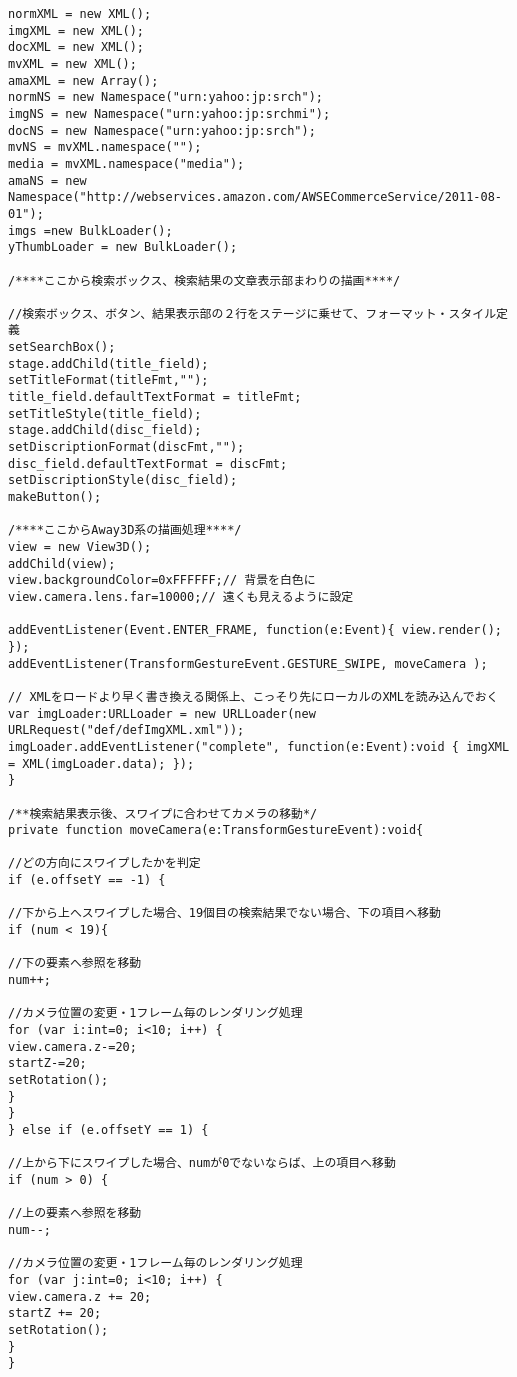 {\begin{verbatim}
normXML = new XML();
imgXML = new XML();
docXML = new XML();
mvXML = new XML();
amaXML = new Array();
normNS = new Namespace("urn:yahoo:jp:srch");
imgNS = new Namespace("urn:yahoo:jp:srchmi");
docNS = new Namespace("urn:yahoo:jp:srch");
mvNS = mvXML.namespace("");
media = mvXML.namespace("media");
amaNS = new Namespace("http://webservices.amazon.com/AWSECommerceService/2011-08-01");
imgs =new BulkLoader();
yThumbLoader = new BulkLoader();

/****ここから検索ボックス、検索結果の文章表示部まわりの描画****/

//検索ボックス、ボタン、結果表示部の２行をステージに乗せて、フォーマット・スタイル定義
setSearchBox();
stage.addChild(title_field);
setTitleFormat(titleFmt,"");
title_field.defaultTextFormat = titleFmt;
setTitleStyle(title_field);
stage.addChild(disc_field);
setDiscriptionFormat(discFmt,"");
disc_field.defaultTextFormat = discFmt;
setDiscriptionStyle(disc_field);
makeButton();

/****ここからAway3D系の描画処理****/
view = new View3D();
addChild(view);
view.backgroundColor=0xFFFFFF;// 背景を白色に
view.camera.lens.far=10000;// 遠くも見えるように設定

addEventListener(Event.ENTER_FRAME, function(e:Event){ view.render(); });
addEventListener(TransformGestureEvent.GESTURE_SWIPE, moveCamera );

// XMLをロードより早く書き換える関係上、こっそり先にローカルのXMLを読み込んでおく
var imgLoader:URLLoader = new URLLoader(new URLRequest("def/defImgXML.xml"));
imgLoader.addEventListener("complete", function(e:Event):void { imgXML = XML(imgLoader.data); });
}

/**検索結果表示後、スワイプに合わせてカメラの移動*/
private function moveCamera(e:TransformGestureEvent):void{

//どの方向にスワイプしたかを判定
if (e.offsetY == -1) {

//下から上へスワイプした場合、19個目の検索結果でない場合、下の項目へ移動
if (num < 19){

//下の要素へ参照を移動
num++;

//カメラ位置の変更・1フレーム毎のレンダリング処理
for (var i:int=0; i<10; i++) {
view.camera.z-=20;
startZ-=20;
setRotation();
}
}
} else if (e.offsetY == 1) {

//上から下にスワイプした場合、numが0でないならば、上の項目へ移動
if (num > 0) {

//上の要素へ参照を移動
num--;

//カメラ位置の変更・1フレーム毎のレンダリング処理
for (var j:int=0; i<10; i++) {
view.camera.z += 20;
startZ += 20;
setRotation();
}
}


\end{verbatim}}
